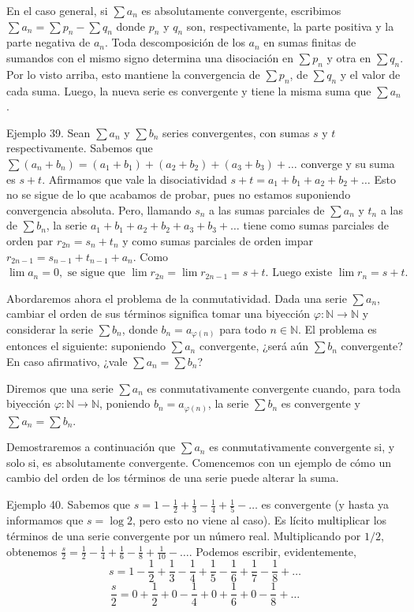 \documentclass[12pt,oneside]{book}
\begin{document}
En el caso general, si \(\sum a_n\) es absolutamente convergente, escribimos \(\sum a_n = \sum p_n - \sum q_n\) donde \(p_n\) y \(q_n\) son, respectivamente, la parte positiva y la parte negativa de \(a_n\). Toda descomposición de los \(a_n\) en sumas finitas de sumandos con el mismo signo determina una disociación en \(\sum p_n\) y otra en \(\sum q_n\). Por lo visto arriba, esto mantiene la convergencia de \(\sum p_n\), de \(\sum q_n\) y el valor de cada suma. Luego, la nueva serie es convergente y tiene la misma suma que \(\sum a_n\).

Ejemplo 39. Sean \(\sum a_n\) y \(\sum b_n\) series convergentes, con sumas \(s\) y \(t\) respectivamente. Sabemos que \(\sum (a_n + b_n) = (a_1 + b_1) + (a_2 + b_2) + (a_3 + b_3) + \dots\) converge y su suma es \(s + t\). Afirmamos que vale la disociatividad \(s + t = a_1 + b_1 + a_2 + b_2 + \dots\) Esto no se sigue de lo que acabamos de probar, pues no estamos suponiendo convergencia absoluta. Pero, llamando \(s_n\) a las sumas parciales de \(\sum a_n\) y \(t_n\) a las de \(\sum b_n\), la serie \(a_1 + b_1 + a_2 + b_2 + a_3 + b_3 + \dots\) tiene como sumas parciales de orden par \(r_{2n} = s_n + t_n\) y como sumas parciales de orden impar \(r_{2n-1} = s_{n-1} + t_{n-1} + a_n\). Como \(\lim a_n = 0,\text{ se sigue que }\lim r_{2n} = \lim r_{2n-1} = s + t.\text{ Luego existe }\lim r_n = s + t.\)

Abordaremos ahora el problema de la conmutatividad. Dada una serie \(\sum a_n\), cambiar el orden de sus términos significa tomar una biyección \(\varphi: \mathbb{N} \to \mathbb{N}\) y considerar la serie \(\sum b_n\), donde \(b_n = a_{\varphi(n)}\) para todo \(n \in \mathbb{N}\). El problema es entonces el siguiente: suponiendo \(\sum a_n\) convergente, ¿será aún \(\sum b_n\) convergente? En caso afirmativo, ¿vale \(\sum a_n = \sum b_n\)?

Diremos que una serie \(\sum a_n\) es conmutativamente convergente cuando, para toda biyección \(\varphi: \mathbb{N} \to \mathbb{N}\), poniendo \(b_n = a_{\varphi(n)}\), la serie \(\sum b_n\) es convergente y \(\sum a_n = \sum b_n\).

Demostraremos a continuación que \(\sum a_n\) es conmutativamente convergente si, y solo si, es absolutamente convergente. Comencemos con un ejemplo de cómo un cambio del orden de los términos de una serie puede alterar la suma.

Ejemplo 40. Sabemos que \(s = 1 - \frac{1}{2} + \frac{1}{3} - \frac{1}{4} + \frac{1}{5} - \dots\) es convergente (y hasta ya informamos que \(s = \log 2\), pero esto no viene al caso). Es lícito multiplicar los términos de una serie convergente por un número real. Multiplicando por \(1/2\), obtenemos \(\frac{s}{2} = \frac{1}{2} - \frac{1}{4} + \frac{1}{6} - \frac{1}{8} + \frac{1}{10} - \dots\). Podemos escribir, evidentemente,
\[
s = 1 - \frac{1}{2} + \frac{1}{3} - \frac{1}{4} + \frac{1}{5} - \frac{1}{6} + \frac{1}{7} - \frac{1}{8} + \dots
\]
\[
\frac{s}{2} = 0 + \frac{1}{2} + 0 - \frac{1}{4} + 0 + \frac{1}{6} + 0 - \frac{1}{8} + \dots
\]
\end{document}
